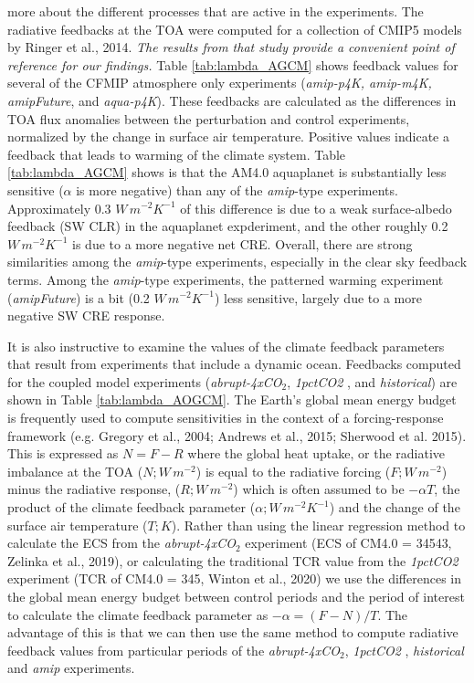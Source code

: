 \documentclass[draft]{agujournal2019}
\begin{document}
more about the different processes that are active in the experiments.    
The radiative feedbacks at the TOA were computed for a collection of CMIP5 models by Ringer et al., 2014.  
\textit{The results from that study provide a convenient point of reference for our findings.}  
Table \ref{tab:lambda_AGCM} shows feedback values for several of the CFMIP atmosphere only experiments 
(\textit{amip-p4K, amip-m4K, amipFuture}, and \textit{aqua-p4K}).  These feedbacks are calculated as the 
differences in TOA flux anomalies between the perturbation and control experiments, normalized 
by the change in surface air temperature.   Positive values indicate a feedback that leads to warming of the climate system. 
Table \ref{tab:lambda_AGCM}  shows is that the AM4.0 aquaplanet is substantially less sensitive 
($\alpha$ is more negative) than any of the \textit{amip}-type experiments.  Approximately 0.3 $W\, m^{-2} K^{-1}$ 
of this difference is due to a weak surface-albedo feedback (SW CLR) in the aquaplanet expderiment, and the other roughly 
0.2 $W\, m^{-2} K^{-1}$ is due to a more negative net CRE.  Overall, there are strong similarities among the 
\textit{amip}-type experiments, especially in the clear sky feedback terms.  Among the \textit{amip}-type experiments, the 
patterned warming experiment (\textit{amipFuture}) is a bit (0.2 $W\, m^{-2} K^{-1}$) less sensitive, largely due to a more 
negative SW CRE response.  


It is also instructive to examine the values of the climate feedback parameters that result from experiments that include a 
dynamic ocean.  Feedbacks computed for the coupled model experiments (\textit{abrupt-4xCO$_2$}, \textit{1pctCO2} , and 
\textit{historical}) are shown in Table \ref{tab:lambda_AOGCM}.  The Earth's global mean energy budget is frequently used 
to compute sensitivities in the context of a forcing-response framework (e.g. Gregory et al., 2004; Andrews et al., 2015; 
Sherwood et al. 2015).  This is expressed as $N=F-R$ where the global heat uptake, or the radiative imbalance at the TOA 
($N; W\, m^{-2}$) is equal to the radiative forcing ($F;  W\, m^{-2}$) minus the radiative response, ($R; W\, m^{-2}$) which is 
often assumed to be $-\alpha T$, the product of the climate feedback parameter ($\alpha;  W\, m^{-2} K^{-1}$) and the change 
of the surface air temperature ($T; K$).  
Rather than using the linear regression method to calculate the ECS from the \textit{abrupt-4xCO$_2$} experiment (ECS of CM4.0 = 34543, Zelinka et al., 2019), or calculating the 
traditional TCR value from the \textit{1pctCO2} experiment (TCR of CM4.0 = 345, Winton et al., 2020) we use the differences in the global mean energy budget between control 
periods and the period of interest to calculate the climate feedback parameter as $-\alpha = (F-N)/T$. 
The advantage of this is that we can then use the same method to compute radiative feedback values from particular periods of the 
\textit{abrupt-4xCO$_2$}, \textit{1pctCO2} , \textit{historical} and \textit{amip} experiments.     
\end{document}
